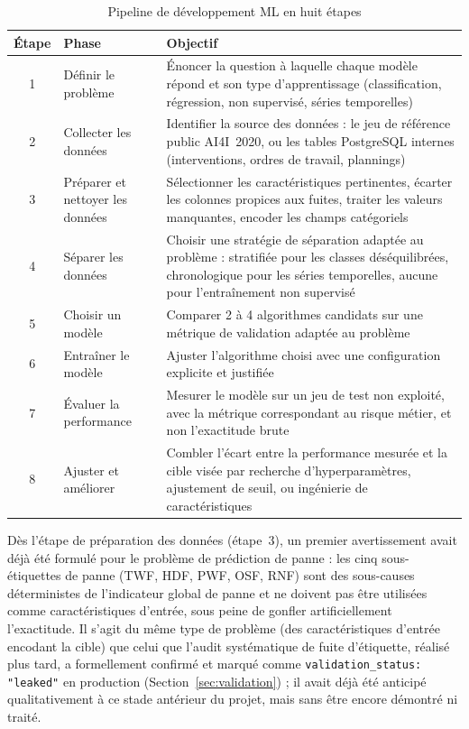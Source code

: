 \begin{table}[h]
\centering
\begin{tabularx}{\textwidth}{|c|X|X|}
\toprule
\textbf{Étape} & \textbf{Phase} & \textbf{Objectif} \\
\midrule
1 & Définir le problème   & Énoncer la question à laquelle chaque modèle répond et son type d'apprentissage (classification, régression, non supervisé, séries temporelles) \\
\midrule
2 & Collecter les données         & Identifier la source des données : le jeu de référence public AI4I~2020, ou les tables PostgreSQL internes (interventions, ordres de travail, plannings) \\
\midrule
3 & Préparer et nettoyer les données & Sélectionner les caractéristiques pertinentes, écarter les colonnes propices aux fuites, traiter les valeurs manquantes, encoder les champs catégoriels \\
\midrule
4 & Séparer les données           & Choisir une stratégie de séparation adaptée au problème : stratifiée pour les classes déséquilibrées, chronologique pour les séries temporelles, aucune pour l'entraînement non supervisé \\
\midrule
5 & Choisir un modèle       & Comparer 2 à 4 algorithmes candidats sur une métrique de validation adaptée au problème \\
\midrule
6 & Entraîner le modèle      & Ajuster l'algorithme choisi avec une configuration explicite et justifiée \\
\midrule
7 & Évaluer la performance & Mesurer le modèle sur un jeu de test non exploité, avec la métrique correspondant au risque métier, et non l'exactitude brute \\
\midrule
8 & Ajuster et améliorer       & Combler l'écart entre la performance mesurée et la cible visée par recherche d'hyperparamètres, ajustement de seuil, ou ingénierie de caractéristiques \\
\bottomrule
\end{tabularx}
\caption{Pipeline de développement ML en huit étapes}
\label{tab:pipeline-steps}
\end{table}

Dès l'étape de préparation des données (étape~3), un premier avertissement avait déjà été formulé pour le problème de prédiction de panne : les cinq sous-étiquettes de panne (TWF, HDF, PWF, OSF, RNF) sont des sous-causes déterministes de l'indicateur global de panne et ne doivent pas être utilisées comme caractéristiques d'entrée, sous peine de gonfler artificiellement l'exactitude. Il s'agit du même type de problème (des caractéristiques d'entrée encodant la cible) que celui que l'audit systématique de fuite d'étiquette, réalisé plus tard, a formellement confirmé et marqué comme \texttt{validation\_status: "leaked"} en production (Section~\ref{sec:validation}) ; il avait déjà été anticipé qualitativement à ce stade antérieur du projet, mais sans être encore démontré ni traité.

